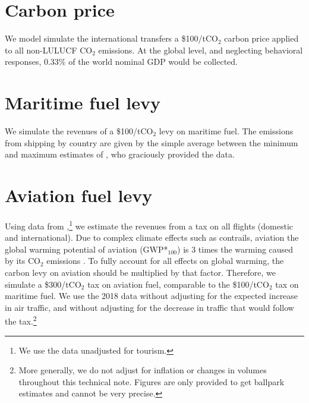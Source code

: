 \documentclass[12pt,english]{article}
\begin{document}
\section{Carbon price}\label{sec:carbon}

We model simulate the international transfers a \$100/tCO$_\text{2}$ carbon price applied to all non-LULUCF CO$_\text{2}$ emissions. At the global level, and neglecting behavioral responses, 0.33\% of the world nominal GDP would be collected. 

\section{Maritime fuel levy}\label{sec:wealth}

We simulate the revenues of a \$100/tCO$_\text{2}$ levy on maritime fuel. The emissions from shipping by country are given by the simple average between the minimum and maximum estimates of \citet{dequiedt_navigating_2024}, who graciously provided the data. 

\section{Aviation fuel levy}\label{sec:wealth}

Using data from \cite{graver_co2_2018},\footnote{We use the data unadjusted for tourism.} we estimate the revenues from a tax on all flights (domestic and international). Due to complex climate effects such as contrails, aviation the global warming potential of aviation (GWP*$_\text{100}$) is 3 times the warming caused by its CO$_\text{2}$ emissions \citep{lee_contribution_2021}. To fully account for all effects on global warming, the carbon levy on aviation should be multiplied by that factor. Therefore, we simulate a \$300/tCO$_\text{2}$ tax on aviation fuel, comparable to the \$100/tCO$_\text{2}$ tax on maritime fuel. We use the 2018 data without adjusting for the expected increase in air traffic, and without adjusting for the decrease in traffic that would follow the tax.\footnote{More generally, we do not adjust for inflation or changes in volumes throughout this technical note. Figures are only provided to get ballpark estimates and cannot be very precise.}
\end{document}
